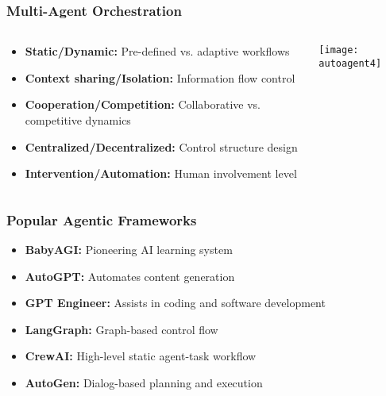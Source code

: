 \begin{frame}[fragile]\frametitle{Multi-Agent Orchestration}
\begin{columns}
    \begin{column}[T]{0.6\linewidth}
        \begin{itemize}
            \item \textbf{Static/Dynamic:} Pre-defined vs. adaptive workflows
            \item \textbf{Context sharing/Isolation:} Information flow control
            \item \textbf{Cooperation/Competition:} Collaborative vs. competitive dynamics
            \item \textbf{Centralized/Decentralized:} Control structure design
            \item \textbf{Intervention/Automation:} Human involvement level
        \end{itemize}
    \end{column}
    \begin{column}[T]{0.4\linewidth}
        \begin{center}
        \texttt{[image: autoagent4]}
        \end{center}
    \end{column}
\end{columns}
\end{frame}

\begin{frame}[fragile]\frametitle{Popular Agentic Frameworks}
\begin{itemize}
    \item \textbf{BabyAGI:} Pioneering AI learning system
    \item \textbf{AutoGPT:} Automates content generation
    \item \textbf{GPT Engineer:} Assists in coding and software development
    \item \textbf{LangGraph:} Graph-based control flow
    \item \textbf{CrewAI:} High-level static agent-task workflow
    \item \textbf{AutoGen:} Dialog-based planning and execution
\end{itemize}
\end{frame}

